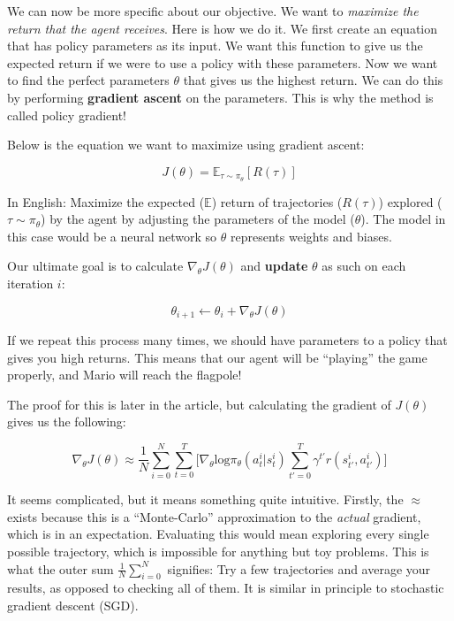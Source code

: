 \begin{flushleft}
    We can now be more specific about our objective. We want to \textit{maximize the return that the agent receives}. Here is how we do it. We first create an equation that has policy parameters as its input. We want this function to give us the expected return if we were to use a policy with these parameters. Now we want to find the perfect parameters $\theta$ that gives us the highest return. We can do this by performing \textbf{gradient ascent} on the parameters. This is why the method is called policy gradient! \break

    Below is the equation we want to maximize using gradient ascent:

    $$J(\theta) = \mathbb{E}_{\tau \sim \pi_\theta} [R(\tau)]$$

    In English: Maximize the expected ($\mathbb{E}$) return of trajectories ($R(\tau)$) explored ($\tau \sim \pi_\theta$) by the agent by adjusting the parameters of the model ($\theta$). The model in this case would be a neural network so $\theta$ represents weights and biases. \break
    
    Our ultimate goal is to calculate $\nabla_\theta J(\theta)$ and \textbf{update} $\theta$ as such on each iteration $i$:

    $$\theta_{i+1} \leftarrow \theta_i + \nabla_\theta J(\theta)$$

    If we repeat this process many times, we should have parameters to a policy that gives you high returns. This means that our agent will be ``playing'' the game properly, and Mario will reach the flagpole! \break

    The proof for this is later in the article, but calculating the gradient of $J(\theta)$ gives us the following:

    $$\nabla_\theta J(\theta) \approx \frac{1}{N}\sum_{i=0}^N\sum_{t=0}^T\biggl[ \nabla_\theta \mathrm{log}\pi_\theta(a_t^i|s_t^i)\sum_{t'=0}^T \gamma^{t'} r(s_{t'}^i, a_{t'}^i)\biggr]$$

    It seems complicated, but it means something quite intuitive. Firstly, the $\approx$ exists because this is a ``Monte-Carlo'' approximation to the \textit{actual} gradient, which is in an expectation. Evaluating this would mean exploring every single possible trajectory, which is impossible for anything but toy problems. This is what the outer sum $\frac{1}{N}\sum_{i=0}^N$ signifies: Try a few trajectories and average your results, as opposed to checking all of them. It is similar in principle to stochastic gradient descent (SGD). \break


\end{flushleft}
